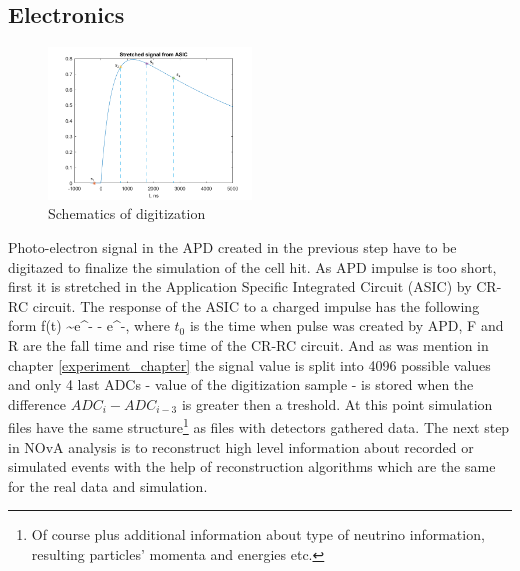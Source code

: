 \subsection{Electronics}
\begin{figure}
\vspace{-20pt}
  \begin{center}
    \includegraphics[width=0.48\textwidth]{figures/digit_scheme.png}
  \end{center}
\vspace{1mm}
\caption{Schematics of digitization}
\end{figure}
Photo-electron signal in the APD created in the previous step have to be digitazed to finalize the simulation
of the cell hit. As APD impulse is too short, first it is stretched in the Application Specific Integrated 
Circuit (ASIC) by CR-RC circuit. The response of the ASIC to a charged impulse has the following form
\be
f(t) \sim e^{-} - e^{-},
\ee
where $t_0$ is the time when pulse was created by APD, F and R are the fall time and rise time of the CR-RC 
circuit. And as was mention in chapter \ref{experiment_chapter} the signal value is split into 4096 possible
values and only 4 last ADCs - value of the digitization sample - is stored when the difference $ADC_i - ADC_{i-3}$
is greater then a treshold. 
At this point simulation files have the same structure\footnote{Of course plus additional information about type 
of neutrino information, resulting particles' momenta and energies etc.} as files with detectors gathered data.
The next step in NOvA analysis is to reconstruct high level information about recorded or simulated events
with the help of reconstruction algorithms which are the same for the real data and simulation.
